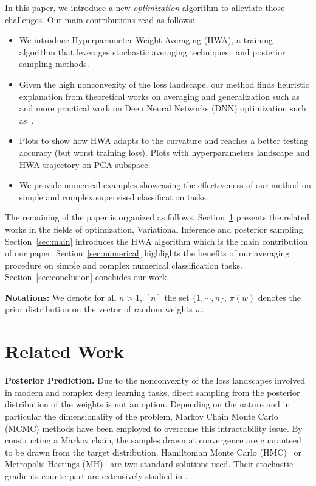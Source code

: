 \documentclass{article} %
\begin{document}
In this paper, we introduce a new \emph{optimization} algorithm to alleviate those challenges.
Our main contributions read as follows:
\begin{itemize}
\item We introduce Hyperparameter Weight Averaging (HWA), a training algorithm that leverages stochastic averaging techniques~\citep{polyak1992acceleration} and posterior sampling methods.
\item Given the high nonconvexity of the loss landscape, our method finds heuristic explanation from theoretical works on averaging and generalization such as~\citep{keskar2016large,he2019asymmetric} and more practical work on Deep Neural Networks (DNN) optimization such as~\citep{izmailov2018averaging}.

\item {\color{red} Plots to show how HWA adapts to the curvature and reaches a better testing accuracy (but worst training loss). Plots with hyperparameters landscape and HWA trajectory on PCA subspace.}

\item We provide numerical examples showcasing the effectiveness of our method on simple and complex supervised classification tasks.
\end{itemize}

The remaining of the paper is organized as follows.
Section~\ref{sec:related} presents the related works in the fields of optimization, Variational Inference and posterior sampling.
Section~\ref{sec:main} introduces the HWA algorithm which is the main contribution of our paper.
Section~\ref{sec:numerical} highlights the benefits of our averaging procedure on simple and complex numerical classification tasks.
Section~\ref{sec:conclusion} concludes our work.

\textbf{Notations:} We denote for all $n >1$, $[n]$ the set $ \{1, \cdots, n\}$, $\pi(w)$ denotes the prior distribution on the vector of random weights $w$.
 
\section{Related Work}\label{sec:related}
\textbf{Posterior Prediction.}
Due to the nonconvexity of the loss landscapes involved in modern and complex deep learning tasks, direct sampling from the posterior distribution of the weights is not an option.
Depending on the nature and in particular the dimensionality of the problem, Markov Chain Monte Carlo (MCMC) methods have been employed to overcome this intractability issue.
By constructing a Markov chain, the samples drawn at convergence are guaranteed to be drawn from the target distribution.
Hamiltonian Monte Carlo (HMC)~\citep{neal2011mcmc} or Metropolis Hastings (MH)~\citep{hastings1970monte} are two standard solutions used.
Their stochastic gradients counterpart are extensively studied in \citep{ma2015complete}.
\end{document}
